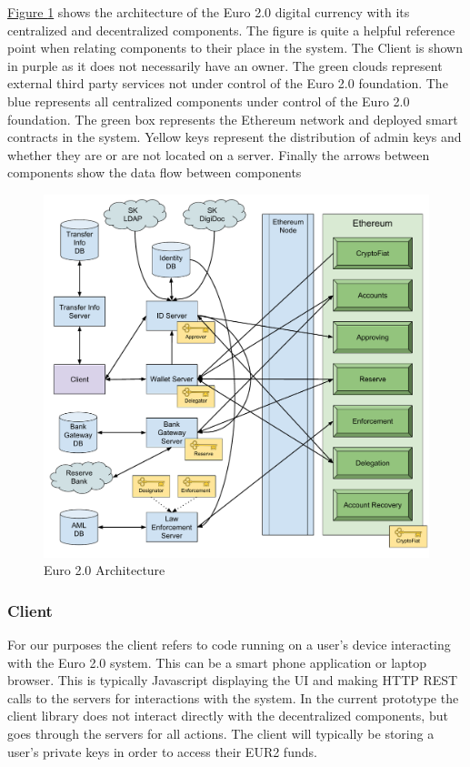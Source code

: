 \documentclass[a4paper,12pt]{article} %
\newcommand{\hyperfigureref}[1]{\hyperref[#1]{Figure \ref{#1}}}
\begin{document}
{\hyperfigureref{fig:euro2architecture} shows the architecture of the Euro 2.0 digital currency with its centralized and decentralized components. The figure is quite a helpful reference point when relating components to their place in the system. The Client is shown in purple as it does not necessarily have an owner. The green clouds represent external third party services not under control of the Euro 2.0 foundation. The blue represents all centralized components under control of the Euro 2.0 foundation. The green box represents the Ethereum network and deployed smart contracts in the system. Yellow keys represent the distribution of admin keys and whether they are or are not located on a server. Finally the arrows between components show the data flow between components

\begin{figure}[ht]
    \centering
    \includegraphics[width=\textwidth]{euro2-architecture}
    \caption{Euro 2.0 Architecture}
    \label{fig:euro2architecture}
\end{figure}

\subsubsection{Client} \label{sssec:3.5:client}
For our purposes the client refers to code running on a user's device interacting with the Euro 2.0 system. This can be a smart phone application or laptop browser. This is typically Javascript displaying the UI and making HTTP REST calls to the servers for interactions with the system. In the current prototype the client library does not interact directly with the decentralized components, but goes through the servers for all actions. The client will typically be storing a user's private keys in order to access their EUR2 funds.

}
\end{document}
